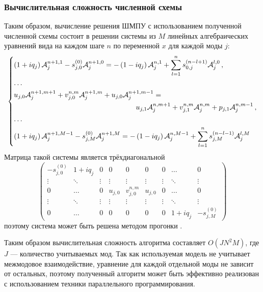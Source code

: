 \documentclass{fefu}
\newcommand{\pa}[1]{\left(#1\right)}
\begin{document}
            \subsubsection{Вычислительная сложность численной схемы}
                \par Таким образом, вычисление решения ШМПУ с использованием полученной численной схемы состоит в решении системы из $M$ линейных алгебраических уравнений вида на каждом шаге $n$ по переменной $x$ для каждой моды $j$:
                \begin{equation}
                    \begin{dcases}
                        \pa{1+iq_j}\mathcal{A}_j^{n+1,1}-s_{j,0}^{\pa{0}}\mathcal{A}_j^{n+1,0}=-\pa{1-iq_j}\mathcal{A}_j^{n,1}+\sum\limits_{l=1}^ns_{0,j}^{\pa{n-l+1}}\mathcal{A}_j^{l,0}\,,\\
                        \dots\\
                        u_{j,0}\mathcal{A}_j^{n+1,m+1}+v_{j,0}^{n,m}\mathcal{A}_j^{n+1,m}+u_{j,0}\mathcal{A}_j^{n+1,m-1}=\\
                        \kern6cm u_{j,1}\mathcal{A}_j^{n,m+1}+v_{j,1}^{n,m}\mathcal{A}_j^{n,m}+p_{j,1}\mathcal{A}_j^{n,m-1}\,,\\
                        \dots\\
                        \pa{1+iq_j}\mathcal{A}_j^{n+1,M-1}-s_{j,M}^{\pa{0}}\mathcal{A}_j^{n+1,M}=-\pa{1-iq_j}\mathcal{A}_j^{n,M-1}+\sum\limits_{l=1}^ns_{j,M}^{\pa{n-l-1}}\mathcal{A}_j^{l,M}
                    \end{dcases}
                \end{equation}
                Матрица такой системы является трёхдиагональной
                \vspace{-0.3cm}
                \begin{equation}
                    \begin{pmatrix}
                        -s_{j,0}^{\pa{0}} & 1+iq_j & 0 & 0 & 0 & 0 & 0 & \dots & 0\\
                        \vdots & \ddots & \vdots & \vdots & \vdots & \vdots & \vdots & \ddots & \vdots\\
                        0 & \dots & 0 & u_{j,0} & v_{j,0}^{n,m} & u_{j,0} & 0 & \dots & 0\\
                        \vdots & \ddots & \vdots & \vdots & \vdots & \vdots & \vdots & \ddots & \vdots\\
                        0 & \dots & 0 & 0 & 0 & 0 & 0 & 1+iq_j & -s_{j,M}^{\pa{0}} 
                    \end{pmatrix}
                \end{equation}
                поэтому система может быть решена методом прогонки \cite{abramov}.
                \par Таким образом вычислительная сложность алгоритма составляет $O\pa{JN^2M}$, где $J$ --- количество учитываемых мод. Так как используемая модель не учитывает межмодовое взаимодействие, уравнение для каждой отдельной моды не зависит от остальных, поэтому полученный алгоритм может быть эффективно реализован с использованием техники параллельного программирования.
\end{document}
